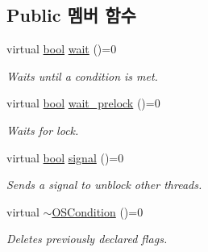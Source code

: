 \subsection*{Public 멤버 함수}
\begin{DoxyCompactItemize}
\item 
virtual \hyperlink{avb__gptp_8h_af6a258d8f3ee5206d682d799316314b1}{bool} \hyperlink{class_o_s_condition_a09d134153211eb547e1574adacda15e9}{wait} ()=0
\begin{DoxyCompactList}\small\item\em Waits until a condition is met. \end{DoxyCompactList}\item 
virtual \hyperlink{avb__gptp_8h_af6a258d8f3ee5206d682d799316314b1}{bool} \hyperlink{class_o_s_condition_a0163ca19d705a3e7f3ee4ba38226ab24}{wait\+\_\+prelock} ()=0
\begin{DoxyCompactList}\small\item\em Waits for lock. \end{DoxyCompactList}\item 
virtual \hyperlink{avb__gptp_8h_af6a258d8f3ee5206d682d799316314b1}{bool} \hyperlink{class_o_s_condition_aec31214198a26aaf91391428e6c9b326}{signal} ()=0
\begin{DoxyCompactList}\small\item\em Sends a signal to unblock other threads. \end{DoxyCompactList}\item 
virtual \hyperlink{class_o_s_condition_a0b7413a07a69056138819afebec1e39b}{$\sim$\+O\+S\+Condition} ()=0
\begin{DoxyCompactList}\small\item\em Deletes previously declared flags. \end{DoxyCompactList}\end{DoxyCompactItemize}

